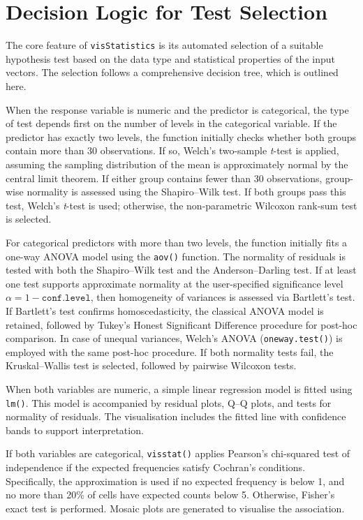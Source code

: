 \documentclass[11pt]{article}
\begin{document}
\section{Decision Logic for Test Selection}

The core feature of \texttt{visStatistics} is its automated selection of a suitable hypothesis test
based on the data type and statistical properties of the input vectors. The selection follows a
comprehensive decision tree, which is outlined here.

When the response variable is numeric and the predictor is categorical, the type of test depends
first on the number of levels in the categorical variable. If the predictor has exactly two levels,
the function initially checks whether both groups contain more than 30 observations. If so,
Welch's two-sample \textit{t}-test is applied, assuming the sampling distribution of the mean is
approximately normal by the central limit theorem. If either group contains fewer than 30
observations, group-wise normality is assessed using the Shapiro–Wilk test. If both groups pass
this test, Welch's \textit{t}-test is used; otherwise, the non-parametric Wilcoxon rank-sum test
is selected.

For categorical predictors with more than two levels, the function initially fits a one-way ANOVA
model using the \texttt{aov()} function. The normality of residuals is tested with both the
Shapiro–Wilk test and the Anderson–Darling test. If at least one test supports approximate
normality at the user-specified significance level $\alpha = 1 - \texttt{conf.level}$, then
homogeneity of variances is assessed via Bartlett’s test. If Bartlett’s test confirms homoscedasticity,
the classical ANOVA model is retained, followed by Tukey’s Honest Significant Difference
procedure for post-hoc comparison. In case of unequal variances, Welch’s ANOVA
(\texttt{oneway.test()}) is employed with the same post-hoc procedure. If both normality
tests fail, the Kruskal–Wallis test is selected, followed by pairwise Wilcoxon tests.

When both variables are numeric, a simple linear regression model is fitted using \texttt{lm()}.
This model is accompanied by residual plots, Q–Q plots, and tests for normality of residuals.
The visualisation includes the fitted line with confidence bands to support interpretation.

If both variables are categorical, \texttt{visstat()} applies Pearson’s chi-squared test of independence
if the expected frequencies satisfy Cochran’s conditions. Specifically, the approximation is used if
no expected frequency is below 1, and no more than 20\% of cells have expected counts below 5.
Otherwise, Fisher’s exact test is performed. Mosaic plots are generated to visualise the association.
\end{document}
